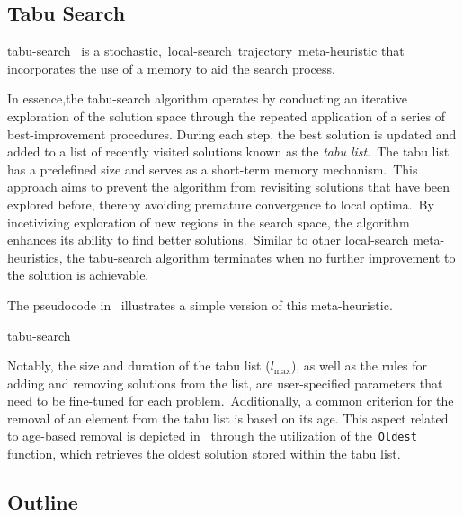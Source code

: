 \subsection{Tabu Search}
\label{subsec:tabu-search}

\acrfull{tabu-search}~\cite{glover1999tabu,gendreau2010tabua,luke2013essentialsa}
is a stochastic,~\acrshort{local-search}~trajectory~\acrshort{meta-heuristic}
that incorporates the use of a memory to aid the search process.

In essence,the \acrshort{tabu-search} algorithm operates by conducting an
iterative exploration of the solution space through the repeated application of
a series of \acrshort{best-improvement} procedures. During each step, the best
solution is updated and added to a list of recently visited solutions known as
the \emph{tabu list}.~The tabu list has a predefined size and serves as a
short-term memory mechanism.~This approach aims to prevent the algorithm from
revisiting solutions that have been explored before, thereby avoiding premature
convergence to local optima.~By incetivizing exploration of new regions in the
search space, the algorithm enhances its ability to find better
solutions.~Similar to other \acrshort{local-search} meta-heuristics, the
\acrfull{tabu-search} algorithm terminates when no further improvement to the
solution is achievable.

The pseudocode in~ illustrates a simple version of
this meta-heuristic.

\begin{algorithm}
  
  \caption{\acrlong{tabu-search}}
  \label{algorithm:tabu-search}
\end{algorithm}

Notably, the size and duration of the tabu list ($l_{\max}$), as well as the
rules for adding and removing solutions from the list, are user-specified
parameters that need to be fine-tuned for each problem.~Additionally, a common
criterion for the removal of an element from the tabu list is based on its age.
This aspect related to age-based removal is depicted
in~ through the utilization of the~\texttt{Oldest}
function, which retrieves the oldest solution stored within the tabu list.

\subsection{Outline}
\label{subsec:Outline}

